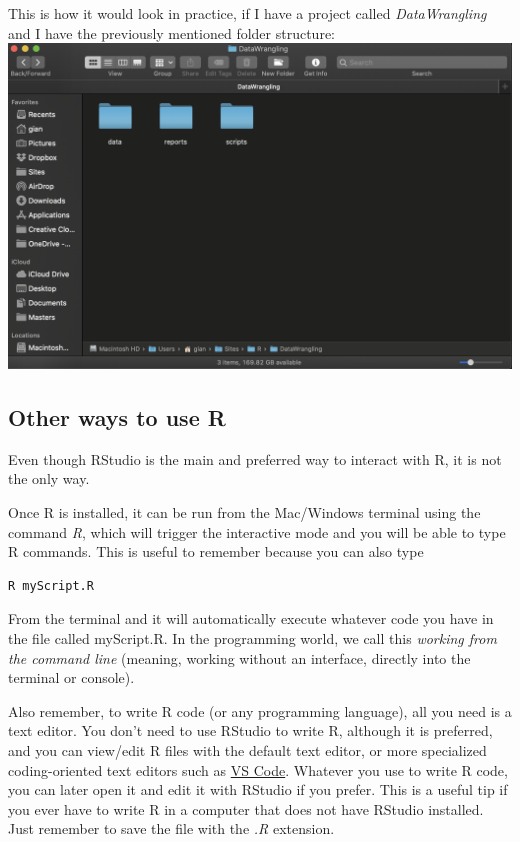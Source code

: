 \documentclass[]{book}
\begin{document}
This is how it would look in practice, if I have a project called \emph{DataWrangling} and I have the previously mentioned folder structure: \includegraphics{images/structure.png}

\hypertarget{other-ways-to-use-r}{%
\subsection{Other ways to use R}\label{other-ways-to-use-r}}

Even though RStudio is the main and preferred way to interact with R, it is not the only way.

Once R is installed, it can be run from the Mac/Windows terminal using the command \emph{R}, which will trigger the interactive mode and you will be able to type R commands. This is useful to remember because you can also type

\begin{verbatim}
R myScript.R
\end{verbatim}

From the terminal and it will automatically execute whatever code you have in the file called myScript.R. In the programming world, we call this \emph{working from the command line} (meaning, working without an interface, directly into the terminal or console).

Also remember, to write R code (or any programming language), all you need is a text editor. You don't need to use RStudio to write R, although it is preferred, and you can view/edit R files with the default text editor, or more specialized coding-oriented text editors such as \href{https://code.visualstudio.com}{VS Code}. Whatever you use to write R code, you can later open it and edit it with RStudio if you prefer. This is a useful tip if you ever have to write R in a computer that does not have RStudio installed. Just remember to save the file with the \emph{.R} extension.
\end{document}
